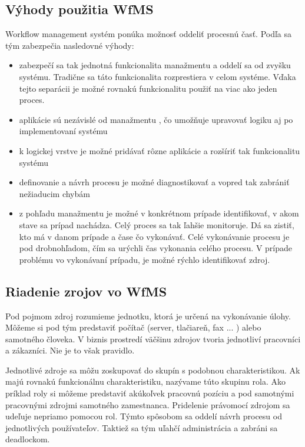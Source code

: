 %
\subsection{Výhody použitia WfMS}
Workflow management systém ponúka možnosť oddeliť procesnú časť. Podľa \cite{workflow_vyhody} sa tým zabezpečia nasledovné výhody:
\begin{itemize}
	\item zabezpečí sa tak jednotná funkcionalita manažmentu a oddelí sa od zvyšku systému. Tradične sa táto funkcionalita rozprestiera v celom systéme. Vďaka tejto separácii je možné rovnakú funkcionalitu použiť na viac ako jeden proces.
	\item aplikácie sú nezávislé od manažmentu , čo umožňuje upravovať logiku aj po implementovaní systému
	\item k logickej vrstve je možné pridávať rôzne aplikácie a rozšíriť tak funkcionalitu systému
	\item definovanie a návrh procesu je možné diagnostikovať a vopred tak zabrániť nežiaducim chybám
	\item z pohľadu manažmentu je možné v konkrétnom prípade identifikovať, v akom stave sa prípad nachádza. Celý proces sa tak ľahšie monitoruje. Dá sa zistiť, kto má v danom prípade a čase čo vykonávať. Celé vykonávanie procesu je pod drobnohľadom, čím sa urýchli čas vykonania celého procesu. V prípade problému vo vykonávaní prípadu, je možné rýchlo identifikovať zdroj.
	
\end{itemize}

\subsection{Riadenie zrojov vo WfMS}
Pod pojmom zdroj rozumieme jednotku, ktorá je určená na vykonávanie úlohy. Môžeme si pod tým predstaviť počítač (server, tlačiareň, fax ... ) alebo samotného človeka. V biznis prostredí väčšinu zdrojov tvoria jednotliví pracovníci a zákazníci. Nie je to však pravidlo.

Jednotlivé zdroje sa môžu zoskupovať do skupín s podobnou charakteristikou. Ak majú rovnakú funkcionálnu charakteristiku, nazývame túto skupinu rola.
Ako príklad roly si môžeme predstaviť akúkoľvek pracovnú pozíciu a pod samotnými pracovnými zdrojmi samotného zamestnanca. Pridelenie právomocí zdrojom sa udeľuje nepriamo pomocou rol. Týmto spôsobom sa oddelí návrh procesu od jednotlivých používateľov. Taktiež sa tým uľahčí administrácia a zabráni sa deadlockom.


